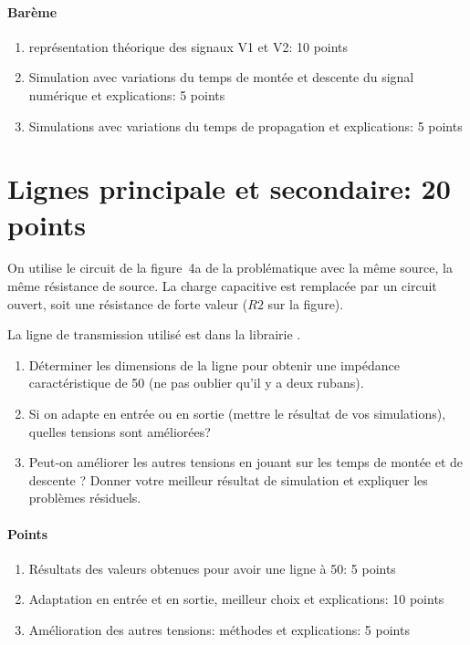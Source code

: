 \documentclass[DIV=15,paper=letter,titlepage=true,fontsize=12pt,headings=normal,captions=nooneline]{scrartcl}
\begin{document}
\paragraph{Barème} 
\begin{enumerate}
	\item représentation théorique des signaux V1 et V2: 10 points
	\item Simulation avec variations du temps de montée et descente du signal numérique et explications: 5 points
	\item Simulations avec variations du temps de propagation et explications:  5 points
\end{enumerate}


\section{Lignes principale et secondaire: 20 points}
On utilise le circuit de la figure~4a de la problématique avec la même source, la même résistance de source. La charge capacitive est remplacée par un circuit ouvert, soit une résistance de forte valeur ($R2$ sur la figure).

La ligne de transmission utilisé est  dans la librairie .

\begin{enumerate} 
	\item Déterminer les dimensions de la ligne pour obtenir une impédance caractéristique de \unit{50}{\ohm} (ne pas oublier qu'il y a deux rubans).
	\item Si on adapte en entrée ou en sortie (mettre le résultat de vos simulations), quelles tensions sont améliorées?
	\item Peut-on améliorer les autres tensions en jouant sur les temps de montée et de descente ? Donner votre meilleur résultat de simulation et expliquer les problèmes résiduels.
\end{enumerate}

\paragraph{Points} 
\begin{enumerate}
	\item Résultats des valeurs obtenues pour avoir une ligne à \unit{50}{\ohm}: 5 points
	\item Adaptation en entrée et en sortie, meilleur choix et explications: 10 points
	\item Amélioration des autres tensions: méthodes et explications: 5 points
\end{enumerate}
\end{document}
